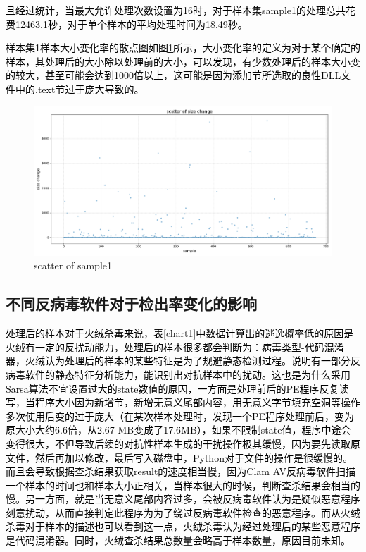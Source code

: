 \textcolor{black}{且经过统计，当最大允许处理次数设置为16时，对于样本集sample1的处理总共花费12463.1秒，对于单个样本的平均处理时间为18.49秒。}

\textcolor{black}{样本集1样本大小变化率的散点图如图\ref{fig:scatter_of_sample1}所示，大小变化率的定义为对于某个确定的样本，其处理后的大小除以处理前的大小，可以发现，有少数处理后的样本大小变的较大，甚至可能会达到1000倍以上，这可能是因为添加节所选取的良性DLL文件中的.text节过于庞大导致的。}

\begin{figure}
  \centering
  \includegraphics[]{images/scatter_of_sample1.png}
  \caption{scatter of sample1}\label{fig:scatter_of_sample1}
\end{figure}

\subsection{不同反病毒软件对于检出率变化的影响}

\textcolor{black}{处理后的样本对于火绒杀毒来说，表\ref{chart1}中数据计算出的逃逸概率低的原因是火绒有一定的反扰动能力，处理后的样本很多都会判断为：病毒类型-代码混淆器，火绒认为处理后的样本的某些特征是为了规避静态检测过程。说明有一部分反病毒软件的静态特征分析能力，能识别出对抗样本中的扰动。这也是为什么采用Sarsa算法不宜设置过大的state数值的原因，一方面是处理前后的PE程序反复读写，当程序大小因为新增节，新增无意义尾部内容，用无意义字节填充空洞等操作多次使用后变的过于庞大（在某次样本处理时，发现一个PE程序处理前后，变为原大小大约6.6倍，从2.67 MB变成了17.6MB），如果不限制state值，程序中途会变得很大，不但导致后续的对抗性样本生成的干扰操作极其缓慢，因为要先读取原文件，然后再加以修改，最后写入磁盘中，Python对于文件的操作是很缓慢的。而且会导致根据查杀结果获取result的速度相当慢，因为Clam AV反病毒软件扫描一个样本的时间也和样本大小正相关，当样本很大的时候，判断查杀结果会相当的慢。另一方面，就是当无意义尾部内容过多，会被反病毒软件认为是疑似恶意程序刻意扰动，从而直接判定此程序为为了绕过反病毒软件检查的恶意程序。而从火绒杀毒对于样本的描述也可以看到这一点，火绒杀毒认为经过处理后的某些恶意程序是代码混淆器。同时，火绒查杀结果总数量会略高于样本数量，原因目前未知。}

